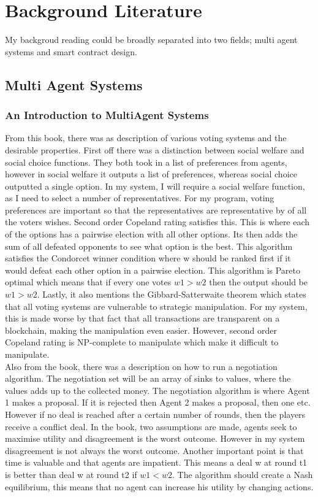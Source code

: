 \chapter{Background Literature} \label{Chapter: Background  Literature}
My backgroud reading could be broadly separated into two fields; multi agent systems and smart contract design.
\section{Multi Agent Systems}
\subsection*{An Introduction to MultiAgent Systems \cite{Wooldridge:2009:pdflatex}}
From this book, there was as description of various voting systems and the desirable properties. First off there was a distinction between social welfare and social choice functions. They both took in a list of preferences from agents, however in social welfare it outputs a list of preferences, whereas social choice outputted a single option. In my system, I will require a social welfare function, as I need to select a number of representatives. For my program, voting preferences are important so that the representatives are representative by of all the voters wishes. Second order Copeland rating satisfies this. This is where each of the options has a pairwise election with all other options. Its then adds the sum of all defeated opponents  to see what option is the best. This algorithm satisfies the Condorcet winner condition where w should be ranked first if it would defeat each other option in a pairwise election. This algorithm is Pareto optimal which means that if every one votes $w1>w2$ then the output should be $w1>w2$. Lastly, it also mentions the Gibbard-Satterwaite theorem which states that all voting systems are vulnerable to strategic manipulation. For my system, this is made worse by that fact that all transactions are transparent on a blockchain, making the manipulation even easier. However, second order Copeland rating is NP-complete to manipulate which make it difficult to manipulate.  \\
Also from the book, there was a description on how to run a negotiation algorithm. The negotiation set will be an array of sinks to values, where the values adds up to the collected money. The negotiation algorithm is where Agent 1 makes a proposal. If it is rejected then Agent 2 makes a proposal, then one etc. However if no deal is reached after a certain number of rounds, then the players receive a conflict deal. In the book, two assumptions are made, agents seek to maximise utility and disagreement is the worst outcome. However in my system disagreement is not always the worst outcome. Another important point is that time is valuable and that agents are impatient. This means a deal w at round t1 is better than deal w at round t2 if $w1<w2$. The algorithm should create a Nash equilibrium, this means that no agent can increase his utility by changing actions. \\
